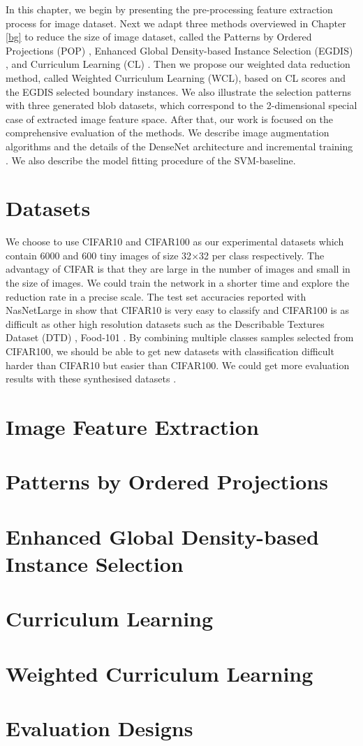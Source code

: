 In this chapter, we begin by presenting the pre-processing feature extraction process for image dataset. Next we adapt three methods overviewed in Chapter \ref{bg} to reduce the size of image dataset, called the Patterns by Ordered Projections (POP) \cite{Riquelme2003a}, Enhanced Global Density-based Instance Selection (EGDIS) \cite{Malhat2020}, and Curriculum Learning (CL) \cite{Hacohen2019a}. Then we propose our weighted data reduction method, called Weighted Curriculum Learning (WCL), based on CL scores and the EGDIS selected boundary instances. We also illustrate the selection patterns with three generated blob datasets, which correspond to the 2-dimensional special case of extracted image feature space. After that, our work is focused on the comprehensive evaluation of the methods. We describe image augmentation algorithms and the details of the DenseNet architecture \cite{Huang2017} and incremental training \cite{Istrate2017}. We also describe the model fitting procedure of the SVM-baseline.

\section{Datasets}
We choose to use CIFAR10 and CIFAR100 \cite{Krizhevsky2009} as our experimental datasets which contain 6000 and 600 tiny images of size 32$\times$32 per class respectively. The advantagy of CIFAR is that they are large in the number of images and small in the size of images. We could train the network in a shorter time and explore the reduction rate in a precise scale. The test set accuracies reported with NasNetLarge \cite{Zoph2018} in \cite{Kornblith2018} show that CIFAR10 is very easy to classify and CIFAR100 is as difficult as other high resolution datasets such as the Describable Textures Dataset (DTD) \cite{Cimpoi2014}, Food-101 \cite{Bossard2014}. By combining multiple classes samples selected from CIFAR100, we should be able to get new datasets with classification difficult harder than CIFAR10 but easier than CIFAR100. We could get more evaluation results with these synthesised datasets \cite{Istrate2019}.

\section{Image Feature Extraction}

\section{Patterns by Ordered Projections}

\section{Enhanced Global Density-based Instance Selection}
\section{Curriculum Learning}
\section{Weighted Curriculum Learning}
\section{Evaluation Designs}